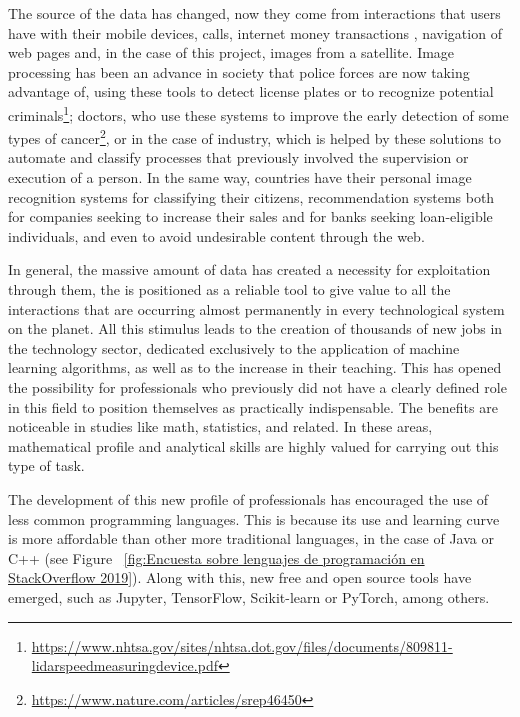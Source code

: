 The source of the data has changed, now they come from interactions that users have with their mobile devices, calls, internet money transactions \cite{crypto}, navigation of web pages and, in the case of this project, images from a satellite.
Image processing has been an advance in society that police forces are now taking advantage of, using these tools to detect license plates or to recognize potential criminals\footnote{\url{https://www.nhtsa.gov/sites/nhtsa.dot.gov/files/documents/809811-lidarspeedmeasuringdevice.pdf}}; doctors, who use these systems \cite{medic} to improve the early detection of some types of cancer\footnote{\url{https://www.nature.com/articles/srep46450}}, or in the case of industry, which is helped by these solutions to automate and classify processes that previously involved the supervision or execution of a person.
In the same way, countries have their personal image recognition systems for classifying their citizens, recommendation systems both for companies seeking to increase their sales and for banks seeking loan-eligible individuals, and even to avoid undesirable content through the web.



In general, the massive amount of data has created a necessity for exploitation
through them, the  is positioned as a reliable tool to give value to all the interactions that are occurring almost permanently
in every technological system on the planet.
All this stimulus leads to the creation of thousands of new jobs in the technology sector, dedicated exclusively to the application of machine learning algorithms, as well as to the increase in their teaching.
This has opened the possibility for professionals who previously did not have a clearly defined role in this field to position themselves as practically indispensable.
The benefits are noticeable in studies like math, statistics, and related. In these areas, mathematical profile and analytical skills are highly valued for carrying out this type of task.


The development of this new profile of professionals has encouraged the use of less common programming languages. This is because its use and learning curve is more affordable than   other more traditional languages, in the case of Java or C++ (see Figure ~\ref{fig:Encuesta sobre lenguajes de programación en StackOverflow 2019}). Along with this, new free and open source \cite{open} tools have emerged, such as Jupyter, TensorFlow, Scikit-learn or PyTorch, among others.


